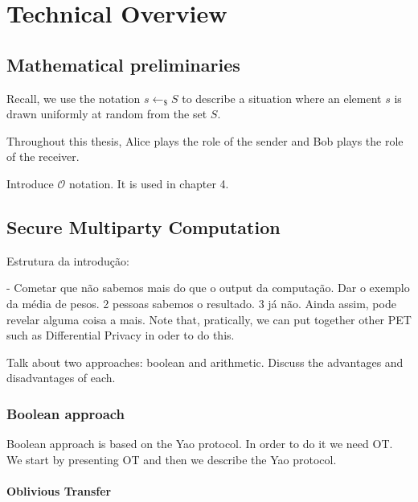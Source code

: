 


%

\chapter{Technical Overview}

\section{Mathematical preliminaries}

Recall, we use the notation $s\leftarrow_{\$}S$ to describe a situation where an element $s$ is drawn uniformly at random from the set $S$.

Throughout this thesis, Alice plays the role of the sender and Bob plays the role of the receiver.

Introduce $\mathcal{O}$ notation. It is used in chapter 4.


\section{Secure Multiparty Computation}


Estrutura da introdução:

- Cometar que não sabemos mais do que o output da computação. Dar o exemplo da média de pesos. 2 pessoas sabemos o resultado. 3 já não. Ainda assim, pode revelar alguma coisa a mais. Note that, pratically, we can put together other PET such as Differential Privacy in oder to do this.




Talk about two approaches: boolean and arithmetic. Discuss the advantages and disadvantages of each.

\subsection{Boolean approach}

Boolean approach is based on the Yao protocol. In order to do it we need OT. We start by presenting OT and then we describe the Yao protocol.


\subsubsection{Oblivious Transfer}

